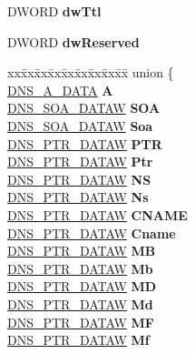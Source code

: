 \begin{DoxyCompactItemize}
\begin{tabbing}
\end{tabbing}\item 
\mbox{\label{struct___dns_record_w_ada2bb3e17a261260e6c4fb1ccfcf40a5}} 
D\+W\+O\+RD {\bfseries dw\+Ttl}
\item 
\mbox{\label{struct___dns_record_w_ae198a7e799a9771b6e5016a690a56b2a}} 
D\+W\+O\+RD {\bfseries dw\+Reserved}
\item 
\mbox{\label{struct___dns_record_w_a7cd3e84758d906e4f91bb97452495177}} 
\begin{tabbing}
xx\=xx\=xx\=xx\=xx\=xx\=xx\=xx\=xx\=\kill
union \{\\
\>\hyperlink{struct_d_n_s___a___d_a_t_a}{DNS\_A\_DATA} {\bfseries A}\\
\>\hyperlink{struct_d_n_s___s_o_a___d_a_t_a_w}{DNS\_SOA\_DATAW} {\bfseries SOA}\\
\>\hyperlink{struct_d_n_s___s_o_a___d_a_t_a_w}{DNS\_SOA\_DATAW} {\bfseries Soa}\\
\>\hyperlink{struct_d_n_s___p_t_r___d_a_t_a_w}{DNS\_PTR\_DATAW} {\bfseries PTR}\\
\>\hyperlink{struct_d_n_s___p_t_r___d_a_t_a_w}{DNS\_PTR\_DATAW} {\bfseries Ptr}\\
\>\hyperlink{struct_d_n_s___p_t_r___d_a_t_a_w}{DNS\_PTR\_DATAW} {\bfseries NS}\\
\>\hyperlink{struct_d_n_s___p_t_r___d_a_t_a_w}{DNS\_PTR\_DATAW} {\bfseries Ns}\\
\>\hyperlink{struct_d_n_s___p_t_r___d_a_t_a_w}{DNS\_PTR\_DATAW} {\bfseries CNAME}\\
\>\hyperlink{struct_d_n_s___p_t_r___d_a_t_a_w}{DNS\_PTR\_DATAW} {\bfseries Cname}\\
\>\hyperlink{struct_d_n_s___p_t_r___d_a_t_a_w}{DNS\_PTR\_DATAW} {\bfseries MB}\\
\>\hyperlink{struct_d_n_s___p_t_r___d_a_t_a_w}{DNS\_PTR\_DATAW} {\bfseries Mb}\\
\>\hyperlink{struct_d_n_s___p_t_r___d_a_t_a_w}{DNS\_PTR\_DATAW} {\bfseries MD}\\
\>\hyperlink{struct_d_n_s___p_t_r___d_a_t_a_w}{DNS\_PTR\_DATAW} {\bfseries Md}\\
\>\hyperlink{struct_d_n_s___p_t_r___d_a_t_a_w}{DNS\_PTR\_DATAW} {\bfseries MF}\\
\>\hyperlink{struct_d_n_s___p_t_r___d_a_t_a_w}{DNS\_PTR\_DATAW} {\bfseries Mf}\\

\end{tabbing}
\end{DoxyCompactItemize}
